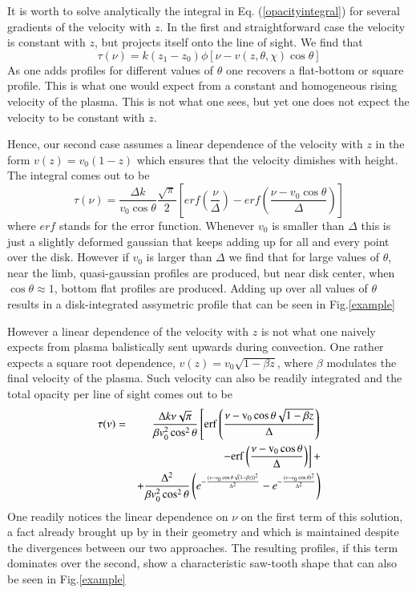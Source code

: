 \documentclass{/Users/art2/TeX/aanda/aa}
\begin{document}
It is worth to solve analytically the integral in Eq. (\ref{opacityintegral}) for several gradients of the velocity with $z$.  In the first and straightforward case the 
velocity is constant with $z$, but projects itself onto the line of sight. We find that
\begin{equation}
   \tau(\nu)=k (z_1-z_0)\phi[\nu-v(z,\theta,\chi)\cos \theta]
\end{equation}
As one adds profiles for different values of $\theta$ one recovers a flat-bottom or square profile. This is what one would expect from a constant 
and homogeneous rising velocity of the plasma. This is not what one sees, but yet one does not expect the velocity to be constant with $z$.

Hence, our second case assumes a linear dependence of the velocity with $z$ in the form $v(z)=v_0(1-z)$ which ensures that the velocity dimishes 
with height. The integral comes out to be
\begin{equation}
   \tau(\nu)=\frac{\Delta k}{v_0\cos\theta}\frac{\sqrt{\pi}}{2} \left[ erf\left(\frac{\nu}{\Delta}\right) - erf\left(\frac{\nu-v_0\cos\theta}{\Delta}\right) \right]
\end{equation}
where $erf$ stands for the error function. Whenever $v_0$ is smaller than $\Delta$ this is just a slightly deformed gaussian that keeps adding 
up for all and every point over the disk. However if $v_0$ is larger than $\Delta$ we find that for large values of $\theta$, near the limb, quasi-gaussian 
profiles are produced, but near disk center, when $\cos \theta \approx 1$, bottom flat profiles are produced. Adding up over all values of $\theta$ results 
in a disk-integrated assymetric profile that can be seen in Fig.\ref{example}

However a linear dependence of the velocity with $z$ is not what one naively expects from plasma balistically sent upwards during convection. One 
rather expects a square root dependence, $v(z)=v_0\sqrt{1-\beta z}$, where  $\beta$ modulates  the final velocity of the plasma. Such 
velocity can also be readily integrated and the total opacity per line of sight comes out to be
\begin{eqnarray}
   \tau(\nu)&=&\frac{\Delta k \nu \sqrt{\pi}}{\beta v_0^2\cos^2\theta} \left[ \rm{erf}\left(\frac{\nu-v_0\cos \theta\sqrt{1-\beta z}}{\Delta}\right) \right.  \nonumber \\
   &&\left. -\rm{erf}\left(\frac{\nu-v_0\cos\theta}{\Delta}\right) \right]+\nonumber \\
   &&+\frac{\Delta^2}{\beta v_0^2\cos^2\theta}\left(e^{-\frac{(\nu-v_0\cos\theta \sqrt(1-\beta z))^2}{\Delta^2}}-e^{-\frac{(\nu-v_0\cos\theta)^2}{\Delta^2}}\right)
\end{eqnarray}
One readily notices the linear dependence on $\nu$ on the first term of this solution, a fact already brought up by \cite{bertout_line_1987} 
in their geometry and which is maintained despite the divergences 
between our two approaches. The resulting profiles, if this term dominates over the second, show a characteristic saw-tooth shape that 
can also be seen in Fig.\ref{example}
\end{document}
